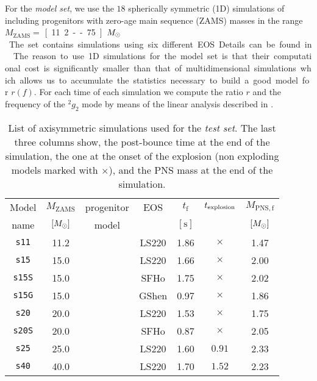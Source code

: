 For the {\it model set}, we use the $18$ spherically symmetric (1D) simulations of~\citep{Torres:2019a} including progenitors with zero-age main sequence (ZAMS) masses in the range $M_{\mathrm{ZAMS}}=$ \unit[11.2 -- 75]{$M_{\odot}$}. The set contains simulations using six different EOS. Details can be found in~\citep{Torres:2019a}. The reason to use 1D simulations for the model set is that their computational cost is significantly smaller than that of multidimensional simulations which allows us to accumulate the statistics necessary to build a good model for $r(f)$.
For each time of each simulation we compute the ratio $r$ and the frequency of the $^2g_2$ mode by means of the linear analysis described in \cite{Torres:2018,Torres:2019a,Torres:2019b}.
 
 \begin{table}
 \centering
 \begin{tabular}{c|ccc|ccc}
  \hline
  Model & $M_\mathrm{ZAMS} $ & progenitor& EOS & $t_{\mathrm{f}}$& $t_{\rm explosion}$ & $M_{\mathrm{PNS, f}}$\\
  name& $[M_{\odot}]$ & model & & $[\mathrm{s}]$& & $[M_{\odot}]$ 
  \\ 
  \hline
  \texttt{s11} & 11.2 & \cite{Woosley_Heger_Weaver__2002__ReviewsofModernPhysics__The_evolution_and_explosion_of_massive_stars}& LS220 & 1.86 & $\times$ & 1.47 
  \\ 
  \texttt{s15} & 15.0 & \cite{Woosley_Heger_Weaver__2002__ReviewsofModernPhysics__The_evolution_and_explosion_of_massive_stars}& LS220 & 1.66 & $\times$ & 2.00 
    \\ 
  \texttt{s15S} & 15.0 & \cite{Woosley_Heger_Weaver__2002__ReviewsofModernPhysics__The_evolution_and_explosion_of_massive_stars}& SFHo & 1.75 & $\times$ & 2.02 
    \\ 
  \texttt{s15G} & 15.0 & \cite{Woosley_Heger_Weaver__2002__ReviewsofModernPhysics__The_evolution_and_explosion_of_massive_stars}& GShen & 0.97 & $\times$ & 1.86
     \\ 
  \texttt{s20} & 20.0 & \cite{Woosley_Heger_Weaver__2002__ReviewsofModernPhysics__The_evolution_and_explosion_of_massive_stars}& LS220 & 1.53 & $\times$ & 1.75 
    \\ 
  \texttt{s20S} & 20.0 & \cite{Woosley_Heger__2007__physrep__Nucleosynthesisandremnantsinmassivestarsofsolarmetallicity} & SFHo & 0.87 & $\times$ & 2.05 
  \\ 
  \texttt{s25} & 25.0 & \cite{Woosley_Heger_Weaver__2002__ReviewsofModernPhysics__The_evolution_and_explosion_of_massive_stars}& LS220 & 1.60 & $0.91$ & 2.33 
    \\ 
  \texttt{s40} & 40.0 & \cite{Woosley_Heger_Weaver__2002__ReviewsofModernPhysics__The_evolution_and_explosion_of_massive_stars}& LS220 & 1.70 & $1.52$ & 2.23 
    \\ \hline
 \end{tabular}
 \caption{%
  List of axisymmetric simulations {used for the {\it test set}}. 
  {The last three columns show, the post-bounce time at the end of the
  simulation, the one at the onset of the explosion (non exploding models marked
  with $\times$), and the PNS mass at the end of the simulation.}
 }
 \label{Tab:2dSimList}
\end{table}

